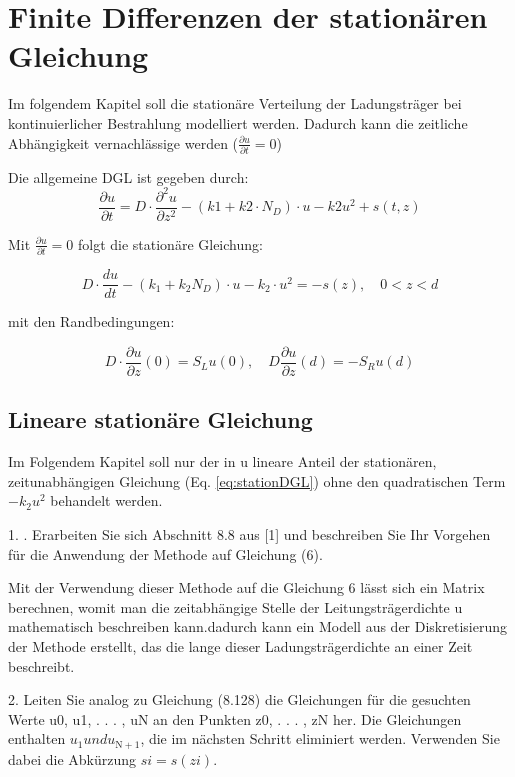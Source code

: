 \chapter{Finite Differenzen der stationären Gleichung}
Im folgendem Kapitel soll die stationäre Verteilung der Ladungsträger bei kontinuierlicher Bestrahlung modelliert werden. 
Dadurch kann die zeitliche Abhängigkeit vernachlässige werden ($\frac{\partial u}{\partial t}=0$)
 
Die allgemeine DGL ist gegeben durch:
\begin{equation}
	\frac{\partial u}{\partial t}= D\cdot\frac{\partial ^2 u }{\partial z^2}-(k1+k2\cdot N_D)\cdot u -k2u^2 +s(t,z)
\end{equation}

Mit $\frac{\partial u}{\partial t}=0$ folgt die stationäre Gleichung:

\begin{equation}\label{eq:stationDGL}
	D\cdot \frac{du}{dt} -\left( k_1 +k_2 N_D\right)\cdot u-k_2\cdot u^2=-s(z), \quad 0 <z<d
\end{equation}

mit den Randbedingungen:

\begin{equation}
	D\cdot \frac{\partial u}{\partial z}(0)=S_Lu(0),\quad D\frac{\partial u}{\partial z}(d)=-S_Ru(d)
\end{equation}
\section{Lineare stationäre Gleichung}
Im Folgendem Kapitel soll nur der in u lineare Anteil der stationären, zeitunabhängigen Gleichung (Eq. \ref{eq:stationDGL}) ohne den quadratischen Term $-k_2u^2$ behandelt werden\cite{Prof.Dr.AndreasZeiser.April2021}.

1. . Erarbeiten Sie sich Abschnitt 8.8 aus [1] und beschreiben Sie Ihr Vorgehen für die Anwendung der Methode auf Gleichung (6).

Mit der Verwendung dieser Methode auf die Gleichung 6 lässt sich ein Matrix berechnen, womit man die zeitabhängige Stelle der Leitungsträgerdichte u mathematisch beschreiben kann.dadurch kann ein Modell aus der Diskretisierung der Methode erstellt, das die lange dieser Ladungsträgerdichte an einer Zeit beschreibt.

2. Leiten Sie analog zu Gleichung (8.128) die Gleichungen für die gesuchten Werte  u0, u1, . . . , uN an den Punkten z0, . . . , zN her. Die Gleichungen enthalten $u_1 und u_\mathrm{N+1}$, die im nächsten Schritt eliminiert werden. Verwenden Sie dabei die Abkürzung $ si = s(zi)$.


